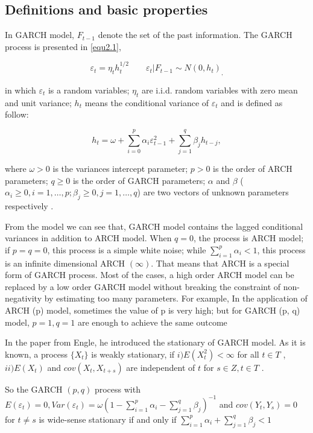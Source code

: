 \subsection{Definitions and basic properties}
In GARCH model, $F_{t-1}$ denote the set of the past information. The GARCH process is presented in \ref{equ2.1},

\begin{equation} 
\label{equ2.1}
	\varepsilon_t =  \eta_t h_t^{1/2}    \qquad    \varepsilon_{t}|F_{t-1}\sim N(0,h_{t})_,
 \end{equation} 
 
in which $\varepsilon_t$ is a random variables; $\eta_t$ are i.i.d. random  variables with zero mean and unit variance; $h_{t}$ means the conditional variance of $\varepsilon_{t}$ and is defined as follow:

\begin{equation} 
h_t = \omega + \sum_{i=0}^p \alpha_i \varepsilon_{t-1}^2 + \sum_{j=1}^q\beta_j h_{t-j},
\end{equation} 

where $\omega>0$ is the variances intercept parameter; $p>0$ is the order of ARCH parameters; $q \geq 0$ is the order of GARCH parameters; $\alpha$ and $\beta$ ( $ \alpha_i \geq 0, i=1, \dots ,p; \beta_j \geq 0, j=1,\dots,q$) are two vectors of unknown parameters respectively \cite{Bollerslev1986}.

From the model we can see that, GARCH model contains the lagged conditional variances in addition to ARCH model. When  $q=0$, the process is ARCH model; if $ p = q = 0$, this process is a simple white noise; while $\sum_{i=1}^p\alpha_i <1$, this process is an infinite dimensional ARCH  $(\infty)$. That means that ARCH is a special form of GARCH process. Most of the cases, a high order ARCH model can be replaced by a low order GARCH model without breaking the constraint of non-negativity by estimating too many parameters. For example, In the application of ARCH (p) model, sometimes the value of p is very high; but for GARCH (p, q) model, $p=1, q=1$ are enough to achieve the same outcome \cite{Engle1986}


In the paper from Engle, he introduced the stationary of GARCH model. As it is known, a process $\lbrace X_{t} \rbrace$  is weakly stationary,  if $i) E(X_{t}^{2}) < \infty$  for all  $t \in T$ ,$ ii) E(X_{t})$  and $cov(X_t,X_{t+s})$  are independent of $t$ for $s \in Z, t \in T$ \cite{Bougerol1992}.

So the GARCH $(p,q)$ process with $E\left( \varepsilon_t \right) =0, Var(\varepsilon_t) = \omega(1-  \sum_{i=1}^p\alpha_i - \sum_{j=1}^q\beta_j )^{-1}$ and $cov(Y_t,Y_s)=0$ for $t \neq s$ is wide-sense stationary if and only if $\sum_{i=1}^p\alpha_i + \sum_{j=1}^q\beta_j < 1 $ \cite{Bollerslev1986}


